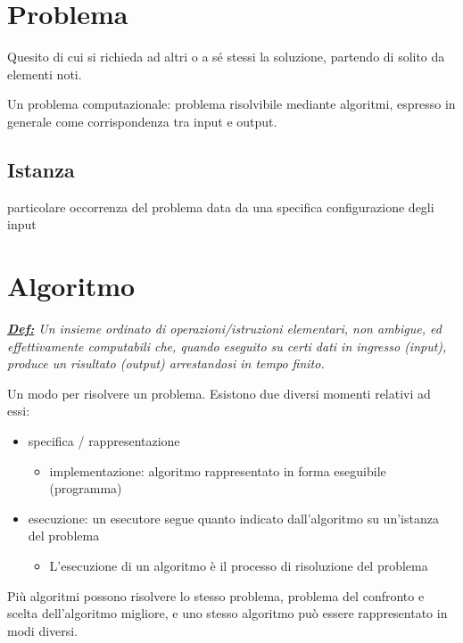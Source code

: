 \section{Problema}\label{problema}

Quesito di cui si richieda ad altri o a sé stessi la soluzione, partendo
di solito da elementi noti.

Un problema computazionale: problema risolvibile mediante algoritmi,
espresso in generale come corrispondenza tra input e output.

\subsection{Istanza}\label{istanza}

particolare occorrenza del problema data da una specifica configurazione
degli input

\section{Algoritmo}\label{algoritmo}

\emph{\textbf{\ul{Def:}} Un insieme ordinato di operazioni/istruzioni
elementari, non ambigue, ed effettivamente computabili che, quando
eseguito su certi dati in ingresso (input), produce un risultato
(output) arrestandosi in tempo finito.}

Un modo per risolvere un problema. Esistono due diversi momenti relativi
ad essi:

\begin{itemize}
\item
  specifica / rappresentazione

  \begin{itemize}
  \item
    implementazione: algoritmo rappresentato in forma eseguibile
    (programma)
  \end{itemize}
\item
  esecuzione: un esecutore segue quanto indicato dall'algoritmo su
  un'istanza del problema

  \begin{itemize}
  \item
    L'esecuzione di un algoritmo è il processo di risoluzione del
    problema
  \end{itemize}
\end{itemize}

Più algoritmi possono risolvere lo stesso problema, problema del
confronto e scelta dell'algoritmo migliore, e uno stesso algoritmo può
essere rappresentato in modi diversi.

